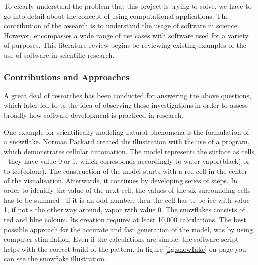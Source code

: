 To clearly understand the problem that this project is trying to solve, we have to go into detail about the concept of using computational applications. The contribution of the research is to understand the usage of software in science. However, encompasses a wide range of use cases with software used for a variety of purposes. This literature review begins be reviewing existing examples of the use of software in scientific research.

\subsubsection{Contributions and Approaches}
\label{sec:contributions}

A great deal of researches has been conducted for answering the above questions, which later led to to the idea of observing these investigations in order to assess broadly how software development is practiced in research.

One example for scientifically modeling natural phenomena is the formulation of a snowflake. Norman Packard created the illustration with the use of a program, which demonstrates cellular automation.\cite{wolfram1984computer}\cite{packard1986lattice} The model represents the surface as cells - they have value 0 or 1, which corresponds accordingly to water vapor(black) or to ice(colour). The construction of the model starts with a red cell in the center of the visualisation. Afterwards, it continues by developing series of steps. In order to identify the value of the next cell, the values of the six surrounding cells has to be summed - if it is an odd number, then the cell has to be ice with value 1, if not - the other way around, vapor with value 0. The snowflakes consists of red and blue colours. Its creation requires at least 10,000 calculations. The best possible approach for the accurate and fast generation of the model, was by using computer stimulation. Even if the calculations are simple, the software script helps with the correct build of the pattern.\cite{wolfram1984computer} In figure \ref{fig:snowflake} on page \pageref{fig:snowflake} you can see the snowflake illustration.


